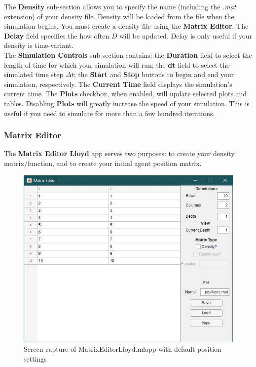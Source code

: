 \documentclass[../CourseManual.tex]{subfiles}
\begin{document}
The \textbf{Density} sub-section allows you to specify the name (including the \textit{.mat} extension) of your density file. Density will be loaded from the file when the simulation begins. You must create a density file using the \textbf{Matrix Editor}. The \textbf{Delay} field specifies the how often $D$ will be updated. Delay is only useful if your density is time-variant. \\

The \textbf{Simulation Controls} sub-section contains: the \textbf{Duration} field to select the length of time for which your simulation will run; the \textbf{dt} field to select the simulated time step $\Delta t$; the \textbf{Start} and \textbf{Stop} buttons to begin and end your simulation, respectively. The \textbf{Current Time} field displays the simulation's current time. The \textbf{Plots} checkbox, when enabled, will update selected plots and tables. Disabling \textbf{Plots} will greatly increase the speed of your simulation. This is useful if you need to simulate for more than a few hundred iterations.

\subsubsection{Matrix Editor} \label{Matrix Editor: Lloyd}

The \textbf{Matrix Editor Lloyd} app serves two purposes: to create your density matrix/function, and to create your initial agent position matrix. \\

\begin{figure}[H]
    \centering
    \includegraphics[width=350pt]{media/MatrixEditorLloyd.JPG}
    \caption{Screen capture of MatrixEditorLloyd.mlapp with default position settings}
    \label{fig: matrix editor lloyd}
\end{figure}
\end{document}
